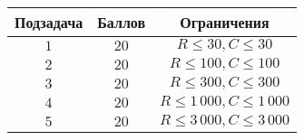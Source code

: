 \begin{tabular}{ | c | c | c | } \hline
    \bf{Подзадача} &    \bf{Баллов} &    \bf{Ограничения} \\ \hline
    $1$ & $20$ & $ R \le 30, C \le 30 $\\ \hline
    $2$ & $20$ & $ R \le 100, C \le 100 $\\ \hline
    $3$ & $20$ & $ R \le 300, C \le 300 $\\ \hline
    $4$ & $20$ & $ R \le 1\,000, C \le 1\,000 $\\ \hline
    $5$ & $20$ & $ R \le 3\,000, C \le 3\,000 $\\ \hline
\end{tabular}